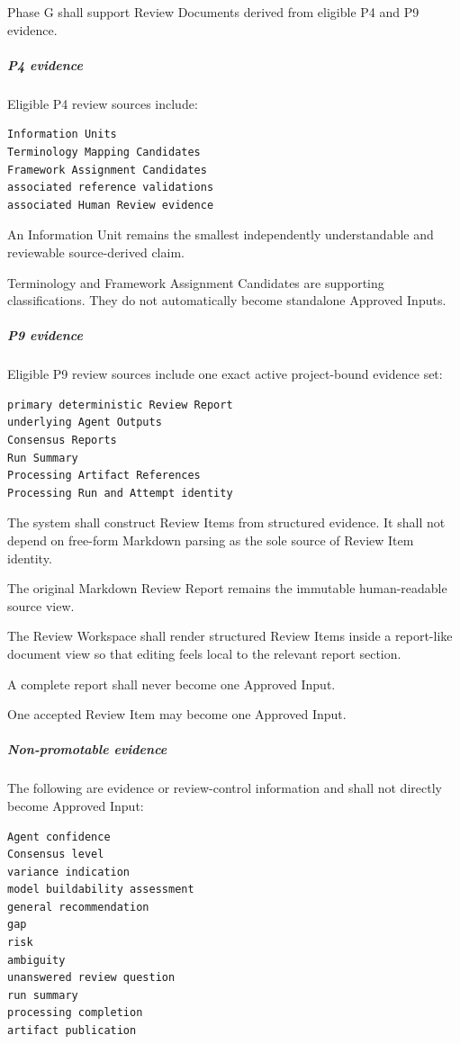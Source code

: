 Phase G shall support Review Documents derived from eligible P4 and P9 evidence.

\hypertarget{p4-evidence}{%
\subparagraph{P4 evidence}\label{p4-evidence}}

Eligible P4 review sources include:

\begin{verbatim}
Information Units
Terminology Mapping Candidates
Framework Assignment Candidates
associated reference validations
associated Human Review evidence
\end{verbatim}

An Information Unit remains the smallest independently understandable and reviewable source-derived claim.

Terminology and Framework Assignment Candidates are supporting classifications. They do not automatically become standalone Approved Inputs.

\hypertarget{p9-evidence}{%
\subparagraph{P9 evidence}\label{p9-evidence}}

Eligible P9 review sources include one exact active project-bound evidence set:

\begin{verbatim}
primary deterministic Review Report
underlying Agent Outputs
Consensus Reports
Run Summary
Processing Artifact References
Processing Run and Attempt identity
\end{verbatim}

The system shall construct Review Items from structured evidence. It shall not depend on free-form Markdown parsing as the sole source of Review Item identity.

The original Markdown Review Report remains the immutable human-readable source view.

The Review Workspace shall render structured Review Items inside a report-like document view so that editing feels local to the relevant report section.

A complete report shall never become one Approved Input.

One accepted Review Item may become one Approved Input.

\hypertarget{non-promotable-evidence}{%
\subparagraph{Non-promotable evidence}\label{non-promotable-evidence}}

The following are evidence or review-control information and shall not directly become Approved Input:

\begin{verbatim}
Agent confidence
Consensus level
variance indication
model buildability assessment
general recommendation
gap
risk
ambiguity
unanswered review question
run summary
processing completion
artifact publication
\end{verbatim}

